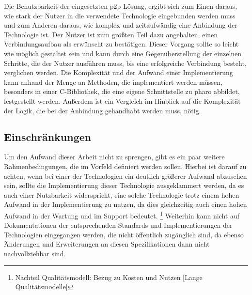 \documentclass[12pt,a4paper]{article}
\begin{document}
\begin{enumerate}
    	Die Benutzbarkeit der eingesetzten p2p Lösung, ergibt sich zum Einen daraus, wie stark der Nutzer in die verwendete Technologie eingebunden werden muss und zum Anderen daraus, wie komplex und zeitaufwändig eine Anbindung der Technologie ist.
    	Der Nutzer ist zum größten Teil dazu angehalten, einen Verbindungsaufbau als erwünscht zu bestätigen. Dieser Vorgang sollte so leicht wie möglich gestaltet sein und kann durch eine Gegenüberstellung der einzelnen Schritte, die der Nutzer ausführen muss, bis eine erfolgreiche Verbindung besteht, verglichen werden.
    	Die Komplexität und der Aufwand einer Implementierung kann anhand der Menge an Methoden, die implementiert werden müssen, besonders in einer C-Bibliothek, die eine eigene Schnittstelle zu pharo abbildet, festgestellt werden. Außerdem ist ein Vergleich im Hinblick auf die Komplexität der Logik, die bei der Anbindung gehandhabt werden muss, nötig.
    	\end{enumerate}
		\subsection{Einschränkungen}
		Um den Aufwand dieser Arbeit nicht zu sprengen, gibt es ein paar weitere Rahmenbedingungen, die im Vorfeld definiert werden sollen. Hierbei ist darauf zu achten, wenn bei einer der Technologien ein deutlich größerer Aufwand abzusehen sein, sollte die Implementierung dieser Technologie ausgeklammert werden, da es auch einer Nutzbarkeit widerspricht, eine solche Technologie trotz einem hohen Aufwand in der Implementierung zu nutzen, da dies gleichzeitig auch einen hohen Aufwand in der Wartung und im Support bedeutet. \footnote{Nachteil Qualitätsmodell: Bezug zu Kosten und Nutzen [Lange Qualitätsmodelle]}
		Weiterhin kann nicht auf Dokumentationen der entsprechenden Standards und Implementierungen der Technologien eingegangen werden, die nicht öffentlich zugänglich sind, da ebenso Änderungen und Erweiterungen an diesen Spezifikationen dann nicht nachvollziehbar sind.
\end{document}
